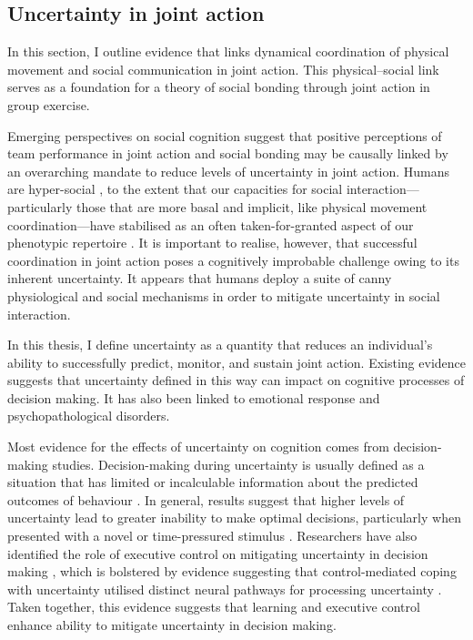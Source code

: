 \begin{CJK}{UTF8}{gbsn}
\subsection{Uncertainty in joint action}
In this section, I outline evidence that links dynamical coordination of physical movement and social communication in joint action.  This physical--social link serves as a foundation for a theory of social bonding through joint action in group exercise.

Emerging perspectives on social cognition suggest that positive perceptions of team performance in joint action and social bonding may be causally linked by an overarching mandate to reduce levels of uncertainty in joint action.  Humans are hyper-social \citep{Tomasello2012a}, to the extent that our capacities for social interaction---particularly those that are more basal and implicit, like physical movement coordination---have stabilised as an often taken-for-granted aspect of our phenotypic repertoire \citep{Wheatley2016}.  It is important to realise, however, that successful coordination in joint action poses a cognitively improbable challenge owing to its inherent uncertainty.  It appears that humans deploy a suite of canny physiological and social mechanisms in order to mitigate uncertainty in social interaction.

In this thesis, I define uncertainty as a quantity that reduces an individual's ability to successfully predict, monitor, and sustain joint action.  Existing evidence suggests that uncertainty defined in this way can impact on cognitive processes of decision making. It has also been linked to emotional response and psychopathological disorders.

Most evidence for the effects of uncertainty on cognition comes from decision-making studies.  Decision-making during uncertainty is usually defined as a situation that has limited or incalculable information about the predicted outcomes of behaviour \citep{Huettel2005}.  In general, results suggest that higher levels of uncertainty lead to greater inability to make optimal decisions, particularly when presented with a novel or time-pressured stimulus \citep[versus a stimulus learned through repeated exposures;][]{Daw2005,Kording2006}.  Researchers have also identified the role of executive control on mitigating uncertainty in decision making \citep{Mushtaq2011}, which is bolstered by evidence suggesting that control-mediated coping with uncertainty utilised distinct neural pathways for processing uncertainty \citep{Huettel2005}.  Taken together, this evidence suggests that learning and executive control enhance ability to mitigate uncertainty in decision making.


\end{CJK}
